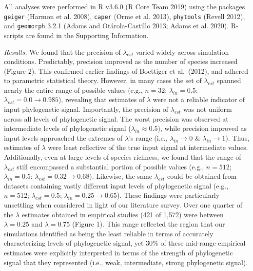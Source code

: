 \documentclass[
]{article}
\begin{document}
All analyses were performed in R v3.6.0 (R Core Team 2019) using the
packages \texttt{geiger} (Harmon et al. 2008), \texttt{caper} (Orme et
al. 2013), \texttt{phytools} (Revell 2012), and \texttt{geomorph} 3.2.1
(Adams and Otárola-Castillo 2013; Adams et al. 2020). R-scripts are
found in the Supporting Information. \hfill\break

\emph{Results.} We found that the precision of \(\lambda_{est}\) varied
widely across simulation conditions. Predictably, precision improved as
the number of species increased (Figure 2). This confirmed earlier
findings of Boettiger et al.~(2012), and adhered to parametric
statistical theory. However, in many cases the set of \(\lambda_{est}\)
spanned nearly the entire range of possible values (e.g., \(n=32\);
\(\lambda_{in}=0.5\): \(\lambda_{est}= 0.0\to 0.985\)), revealing that
estimates of \(\lambda\) were not a reliable indicator of input
phylogenetic signal. Importantly, the precision of \(\lambda_{est}\) was
not uniform across all levels of phylogenetic signal. The worst
precision was observed at intermediate levels of phylogenetic signal
(\(\lambda_{in}\approx0.5\)), while precision improved as input levels
approached the extremes of \(\lambda\)'s range (i.e.,
\(\lambda_{in}\rightarrow0\) \& \(\lambda_{in}\rightarrow1\)). Thus,
estimates of \(\lambda\) were least reflective of the true input signal
at intermediate values. Additionally, even at large levels of species
richness, we found that the range of \(\lambda_{est}\) still encompassed
a substantial portion of possible values (e.g., \(n=512\);
\(\lambda_{in}=0.5\): \(\lambda_{est} = 0.32\to 0.68\)). Likewise, the
same \(\lambda_{est}\) could be obtained from datasets containing vastly
different input levels of phylogenetic signal (e.g., \(n=512\);
\(\lambda_{est} = 0.5\); \(\lambda_{in} = 0.25 \to 0.65\)). These
findings were particularly unsettling when considered in light of our
literature survey. Over one quarter of the \(\lambda\) estimates
obtained in empirical studies (421 of 1,572) were between
\(\lambda=0.25\) and \(\lambda=0.75\) (Figure 1). This range reflected
the region that our simulations identified as being the least reliable
in terms of accurately characterizing levels of phylogenetic signal, yet
30\% of these mid-range empirical estimates were explicitly interpreted
in terms of the strength of phylogenetic signal that they represented
(i.e., weak, intermediate, strong phylogenetic signal). \hfill\break
\end{document}
